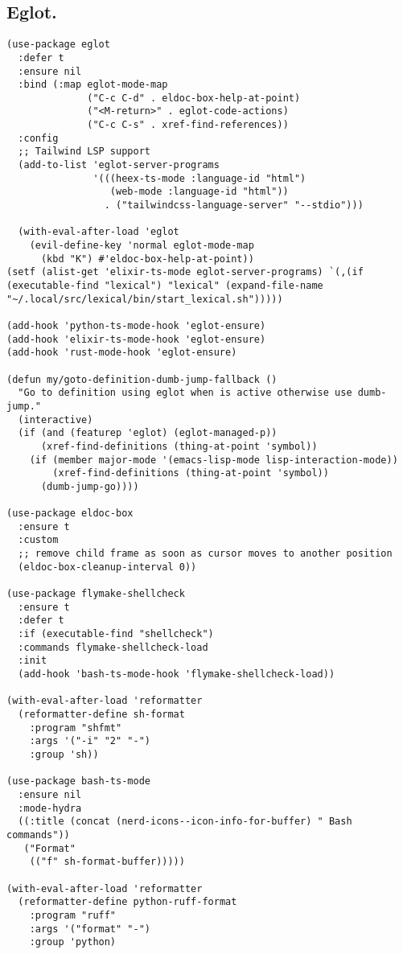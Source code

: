 \documentclass[11pt]{article}
\begin{document}
\subsection{Eglot.}
\label{sec:orgaa005d0}
\begin{verbatim}
(use-package eglot
  :defer t
  :ensure nil
  :bind (:map eglot-mode-map
              ("C-c C-d" . eldoc-box-help-at-point)
              ("<M-return>" . eglot-code-actions)
              ("C-c C-s" . xref-find-references))
  :config
  ;; Tailwind LSP support
  (add-to-list 'eglot-server-programs
               '(((heex-ts-mode :language-id "html")
                  (web-mode :language-id "html"))
                 . ("tailwindcss-language-server" "--stdio")))

  (with-eval-after-load 'eglot
    (evil-define-key 'normal eglot-mode-map
      (kbd "K") #'eldoc-box-help-at-point))
(setf (alist-get 'elixir-ts-mode eglot-server-programs) `(,(if (executable-find "lexical") "lexical" (expand-file-name "~/.local/src/lexical/bin/start_lexical.sh")))))

(add-hook 'python-ts-mode-hook 'eglot-ensure)
(add-hook 'elixir-ts-mode-hook 'eglot-ensure)
(add-hook 'rust-mode-hook 'eglot-ensure)

(defun my/goto-definition-dumb-jump-fallback ()
  "Go to definition using eglot when is active otherwise use dumb-jump."
  (interactive)
  (if (and (featurep 'eglot) (eglot-managed-p))
      (xref-find-definitions (thing-at-point 'symbol))
    (if (member major-mode '(emacs-lisp-mode lisp-interaction-mode))
        (xref-find-definitions (thing-at-point 'symbol))
      (dumb-jump-go))))

(use-package eldoc-box
  :ensure t
  :custom
  ;; remove child frame as soon as cursor moves to another position
  (eldoc-box-cleanup-interval 0))

(use-package flymake-shellcheck
  :ensure t
  :defer t
  :if (executable-find "shellcheck")
  :commands flymake-shellcheck-load
  :init
  (add-hook 'bash-ts-mode-hook 'flymake-shellcheck-load))

(with-eval-after-load 'reformatter
  (reformatter-define sh-format
    :program "shfmt"
    :args '("-i" "2" "-")
    :group 'sh))

(use-package bash-ts-mode
  :ensure nil
  :mode-hydra
  ((:title (concat (nerd-icons--icon-info-for-buffer) " Bash commands"))
   ("Format"
    (("f" sh-format-buffer)))))

(with-eval-after-load 'reformatter
  (reformatter-define python-ruff-format
    :program "ruff"
    :args '("format" "-")
    :group 'python)


\end{verbatim}
\end{document}

